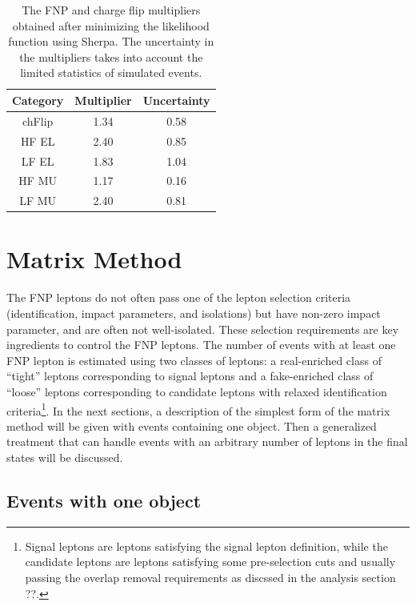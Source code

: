 \begin{table}[htb]
  \caption{The FNP and charge flip multipliers obtained after minimizing the likelihood function using Sherpa.
    The uncertainty in the multipliers takes into account the limited statistics of simulated events.
    \label{t:fake_factors_sherpa}}
  \centering
  \begin{tabular}{|c|c|c|}
    \hline
    Category & Multiplier & Uncertainty  \\
    \hline
    chFlip & 1.34 & 0.58 \\ 
    HF EL & 2.40 & 0.85 \\
    LF EL & 1.83 & 1.04 \\
    HF MU & 1.17 & 0.16 \\
    LF MU & 2.40 & 0.81 \\
    \hline
  \end{tabular}                                                                                         
\end{table}



\section{Matrix Method}


The FNP leptons do not often pass one of the 
lepton selection criteria (identification, impact parameters, and isolations) but have non-zero impact parameter, and are often not 
well-isolated. These selection requirements are key ingredients to control the FNP leptons. 
The number of events with at least one FNP lepton is estimated using two classes of leptons: 
a real-enriched class of ``tight'' leptons corresponding to signal leptons and a fake-enriched class of ``loose'' leptons 
corresponding to candidate leptons with relaxed identification criteria\footnote{Signal leptons are leptons satisfying the signal lepton definition, while the candidate leptons are leptons satisfying some pre-selection cuts and usually passing the overlap removal requirements as discssed in the analysis section ??.}. 
In the next sections, a description of the simplest form of the matrix method will be given with events containing one object. 
Then a generalized treatment that can handle events with an arbitrary number of leptons in the final states will be discussed.

\subsection{Events with one object}

